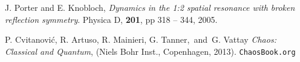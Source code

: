 \begingroup
\renewcommand{\section}[2]{}%
\begin{thebibliography}{}

%

  J. Porter and E. Knobloch, %
  \emph{Dynamics in the 1:2 spatial resonance with broken
  reflection symmetry}.
  Physica D,
  \textbf{201}, pp 318 -- 344,
  2005.%
  
%
  P. Cvitanovi\'{c}, 
  R. Artuso, 
  R. Mainieri,
  G. Tanner,\ and\ G. Vattay
  \emph{Chaos: Classical and Quantum},
  (Niels Bohr Inst., Copenhagen, 2013).
  \texttt{ChaosBook.org}  
\end{thebibliography}
\endgroup
